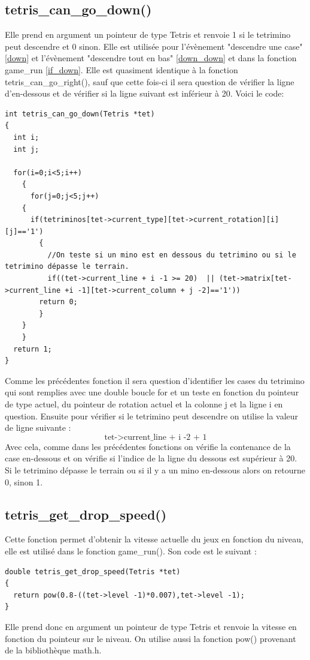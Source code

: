 \documentclass[a4paper,10p]{report}
\begin{document}
\subsection{tetris\_can\_go\_down()}
\label{tetris_can_go_down}
Elle prend en argument un pointeur de type Tetris et renvoie 1 si le tetrimino peut descendre et 0 sinon. Elle est utilisée pour l'évènement "descendre une case" \ref{down} et l'évènement "descendre tout en bas" \ref{down_down} et dans la fonction game\_run \ref{if_down}. Elle est quasiment identique à la fonction tetris\_can\_go\_right(), sauf que cette fois-ci il sera question de vérifier la ligne d'en-dessous et de vérifier si la ligne suivant est inférieur à 20. Voici le code:
\begin{lstlisting}
int tetris_can_go_down(Tetris *tet)
{
  int i;
  int j;

  for(i=0;i<5;i++)
    {
      for(j=0;j<5;j++)
	{
	  if(tetriminos[tet->current_type][tet->current_rotation][i][j]=='1')
	    {
	      //On teste si un mino est en dessous du tetrimino ou si le tetrimino dépasse le terrain.
	      if((tet->current_line + i -1 >= 20)  || (tet->matrix[tet->current_line +i -1][tet->current_column + j -2]=='1'))
		return 0;
	    }
	}
    }
  return 1;
}
\end{lstlisting}
Comme les précédentes fonction il sera question d'identifier les cases du tetrimino qui sont remplies avec une double boucle for et un teste en fonction du pointeur de type actuel, du pointeur de rotation actuel et la colonne j et la ligne i en question. Ensuite pour vérifier si le tetrimino peut descendre on utilise la valeur de ligne suivante :
\begin{equation*}
    \text{tet->current\_line + i -2 + 1}
\end{equation*}
Avec cela, comme dans les précédentes fonctions on vérifie la contenance de la case en-dessous et on vérifie si l'indice de la ligne du dessous est supérieur à 20. Si le tetrimino dépasse le terrain ou si il y a un mino en-dessous alors on retourne 0, sinon 1.

\subsection{tetris\_get\_drop\_speed()}
\label{tetris_get_drop_speed}
Cette fonction permet d'obtenir la vitesse actuelle du jeux en fonction du niveau, elle est utilisé dans le fonction game\_run(). Son code est le suivant :
\begin{lstlisting}
double tetris_get_drop_speed(Tetris *tet)
{
  return pow(0.8-((tet->level -1)*0.007),tet->level -1);
}
\end{lstlisting}
Elle prend donc en argument un pointeur de type Tetris et renvoie la vitesse en fonction du pointeur sur le niveau. On utilise aussi la fonction pow() provenant de la bibliothèque math.h.
\end{document}
